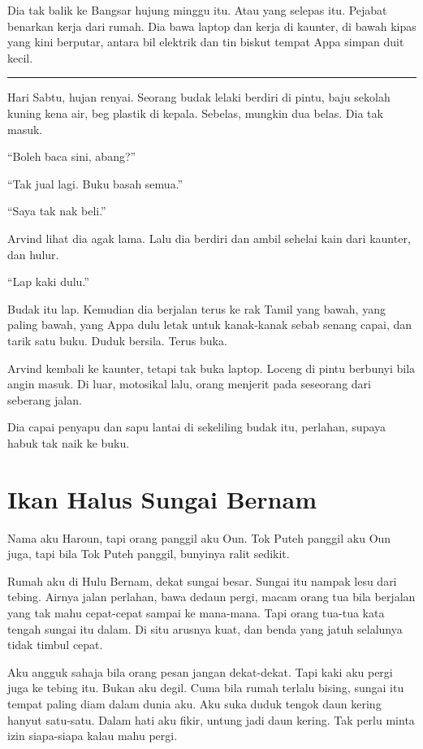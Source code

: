 \documentclass[
  11pt,
  a5paper,
  openany,
  oneside]{book}
\begin{document}
Dia tak balik ke Bangsar hujung minggu itu. Atau yang selepas itu.
Pejabat benarkan kerja dari rumah. Dia bawa laptop dan kerja di kaunter,
di bawah kipas yang kini berputar, antara bil elektrik dan tin biskut
tempat Appa simpan duit kecil.

\begin{center}\rule{0.5\linewidth}{0.5pt}\end{center}

Hari Sabtu, hujan renyai. Seorang budak lelaki berdiri di pintu, baju
sekolah kuning kena air, beg plastik di kepala. Sebelas, mungkin dua
belas. Dia tak masuk.

``Boleh baca sini, abang?''

``Tak jual lagi. Buku basah semua.''

``Saya tak nak beli.''

Arvind lihat dia agak lama. Lalu dia berdiri dan ambil sehelai kain dari
kaunter, dan hulur.

``Lap kaki dulu.''

Budak itu lap. Kemudian dia berjalan terus ke rak Tamil yang bawah, yang
paling bawah, yang Appa dulu letak untuk kanak-kanak sebab senang capai,
dan tarik satu buku. Duduk bersila. Terus buka.

Arvind kembali ke kaunter, tetapi tak buka laptop. Loceng di pintu
berbunyi bila angin masuk. Di luar, motosikal lalu, orang menjerit pada
seseorang dari seberang jalan.

Dia capai penyapu dan sapu lantai di sekeliling budak itu, perlahan,
supaya habuk tak naik ke buku.

\chapter{Ikan Halus Sungai Bernam}\label{ikan-halus-sungai-bernam}

Nama aku Haroun, tapi orang panggil aku Oun. Tok Puteh panggil aku Oun
juga, tapi bila Tok Puteh panggil, bunyinya ralit sedikit.

Rumah aku di Hulu Bernam, dekat sungai besar. Sungai itu nampak lesu
dari tebing. Airnya jalan perlahan, bawa dedaun pergi, macam orang tua
bila berjalan yang tak mahu cepat-cepat sampai ke mana-mana. Tapi orang
tua-tua kata tengah sungai itu dalam. Di situ arusnya kuat, dan benda
yang jatuh selalunya tidak timbul cepat.

Aku angguk sahaja bila orang pesan jangan dekat-dekat. Tapi kaki aku
pergi juga ke tebing itu. Bukan aku degil. Cuma bila rumah terlalu
bising, sungai itu tempat paling diam dalam dunia aku. Aku suka duduk
tengok daun kering hanyut satu-satu. Dalam hati aku fikir, untung jadi
daun kering. Tak perlu minta izin siapa-siapa kalau mahu pergi.
\end{document}
